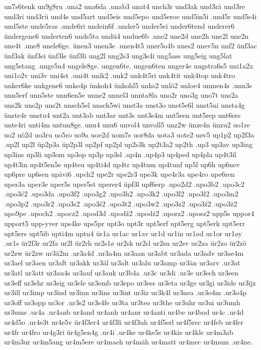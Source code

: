 {{un7s6tenk
un9g8ru
.una2
una6da
.unab3
unat4
unch3r
und3ak
und3rä
und3re
und3ri
und3rü
und4s
und5art
und5eis
und5epo
und5eroe
und5in5i
.und5r
und5s4i
und5ste
unde5ras
.unde6ri
undein6f
.under5
under5ei
under6tend
underer6
ündergene6
underten6
unds5ta
undü4
undue6b
.une2
une2d
une2h
une2l
une2n
une4t
.une8
unele6ge.
ünen3
unen3e
.unen4t5
uner5o4b
unes2
unev5n
unf2
ünf3ac
ünf3ak
ünf3ei
ünf3le
ünf3li
ung2l
ung2s3
ung3s4i
ung5ass
ung5eig
ung5lat
ung5stang
.unge5n4
ungele8ge.
ungen6te.
ungen6ten
unger4e
ungstra6s5
uni1a2x
uni1o2v
uni3v
uni4st
.uni4t
unik2
.unk2
unk4t5ri
unk4tit
unk4top
unk4tro
unker6ke
unkgene6
unko4p
ünkoh4
ünkohl5
unks2
unlö2
unloe4
unmen4s
.unn3s
unn5erf
unn5ste
unn6en5e
unne2
unnel3
unnta8la
uno2r
uno3g
uno7t
uns2a
uns2k
uns2p
uns2t
unsch5el
unsch5wi
unst3a
unst3o
unst5e6l
unst5ui
unsta4g
ünste4r
unstu4
unt2a
unt3ab
unt3ar
unt3s
unt3s4m
unt5een
unt5rep
unt6ers
unte4ri
unti4m
untun8ge.
unu4
unu6
unvol4
unvoll5
unz2w
ünze4n
ünzu2
uo1re
uo2
uö2d
uo3ru
uo5ro
uo9a
uoe2d
uom7s
uor8da
uota3
uote2
uøv5
up1p2
up2f3a
.up2l
up2l
üp2p3a
üp2p3l
up2pf
up2pl
up2s3k
up2t3a2
up2th
.up3
up3av
up3ing
up3ins
up3li
up3om
up3op
up3p
up3sl
.up4n
.up4p3
up4ped
up4pla
up4t3il
up4t3in
up4t5en5e
up4teu
up4ti4d
up4tr
up4tum
up4tunf
up5l
up6h
up6nev
up6pre
up6sen
upåvi6
.upch2
upe2r
upe2r3
upe3k
upe4r3a
upe4ro
upe6ren
uper3a
uper3e
uper5s
uper5st
uperer4
üpf3l
upf6erp
.upo2d2
.upo3b2
.upo3c2
.upo3ć2
.upo3da
.upo3f2
.upo3g2
.upo3h2
.upo3k2
.upo3l2
.upo3ł2
.upo3m2
.upo3p2
.upo3r2
.upo3s2
.upo3ś2
.upo3t2
.upo3w2
.upo3z2
.upo3ź2
.upo3ż2
upo9pe
.upoch2
.upocz2
.upod3d
.upodź2
.upodż2
.uporz2
.uposz2
upp5s
uppor4
upport5
upp-yver
ups4ke
ups5pr
upt3o
upt3r
upt5erf
upt5erg
upt5erk
upt5err
upt5ers
upt5ib
upti4m
uptu4
ür1a
ur1ac
ur1av
ur1d
ur1in
ur1ød
ur1or
ur1øy
.ur1s
ür2f3r
ur2fa
ur2l
ür2rh
ur2s1ø
ur2sk
ur2sl
ur2sn
ur2sv
ur2za
ür2zo
ür2zö
ur2zw
ür2zw
ur3ä2m
.ur3a4d
.ur3a4m
ur3aan
ur3abt
ur3ada
ur3adv
ur3ae4m
ur3ael
ur3aen
ur3aft
ur3akk
ur3äl
ur3alt
ur3alu
ur3amp
ur3än
ur3arv
.ur3at
ur3atl
ur3att
ur3au4s
ur3auf
ur3auk
ur3b4a
.ur3c
ur3di
.ur3e
ur3ech
ur3een
ur3eff
ur3ehr
ur3eig
ur3ele
ur3emb
ur3epo
ur3ess
ur3eta
ur3ge
ur3gi
ur3ide
ur3ijz
ur3ill
ur3imp
ur3ind
ur3inn
ur3ins
ur3int
ur3iz
ur3k4l
ur3nea
.ur3o4m
.ur3o4p
ur3off
ur3opp
ur3or
.ur3s2
ur3s4fe
ur3ta
ur3teo
ur3the
ur3uhr
ur3ui
ur3umh
ur3ums
.ur4a
.ur4anb
ur4and
ur4anh
ur4anr
ur4anti
ur4be
ur4bod
ur4c
.ur4d
ur4d5o
.ur4e3t
ur4e5v
ür4f3er4
ur4f3li
ur4f3uh
ur4f5erl
ur4f5rec
ur4feb
ur4fer
ur4fr
ur4fro
ur4g3ri
ür4g5en4g
.ur4i
.ur4ke
ur4ke5s
ur4kie
ur4kle
ur4m3ab
ur4m3ur
ur4m5ang
ur4m5ere
ur4maeh
ur4mäh
ur4matt
ur4mec
ur4mum
.ur4ne.
}}

